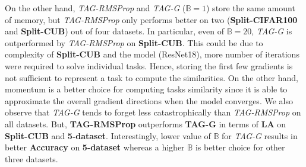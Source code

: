 \documentclass{article} \usepackage{collas2022_conference,times}
\begin{document}
{On the other hand, \textit{TAG-RMSProp} and \textit{TAG-G} ($\mathbb{B}=1$) store the same amount of memory, but \textit{TAG-RMSProp} only performs better on two (\textbf{Split-CIFAR100} and \textbf{Split-CUB}) out of four datasets. In particular, even of $\mathbb{B}=20$, \textit{TAG-G} is outperformed by \textit{TAG-RMSProp} on \textbf{Split-CUB}. This could be due to complexity of \textbf{Split-CUB} and the model (ResNet18), more number of iterations were required to solve individual tasks. Hence, storing the first few gradients is not sufficient to represent a task to compute the similarities. On the other hand, momentum is a better choice for computing tasks similarity since it is able to approximate the overall gradient directions when the model converges. We also observe that \textit{TAG-G} tends to forget less catastrophically than \textit{TAG-RMSProp} on all datasets. But, \textbf{TAG-RMSProp} outperforms \textbf{TAG-G} in terms of \textbf{LA} on \textbf{Split-CUB} and \textbf{5-dataset}. Interestingly, lower value of $\mathbb{B}$ for \textit{TAG-G} results in better \textbf{Accuracy} on \textbf{5-dataset} whereas a higher $\mathbb{B}$ is better choice for other three datasets. 

}
\end{document}
